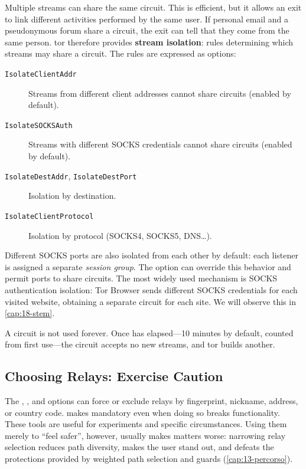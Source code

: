 Multiple streams can share the same circuit. This is efficient, but it allows an exit to link different activities performed by the same user. If personal email and a pseudonymous forum share a circuit, the exit can tell that they come from the same person. tor therefore provides \textbf{stream isolation}: rules determining which streams may share a circuit. The rules are expressed as  options:
\begin{description}
  \item[\texttt{IsolateClientAddr}] Streams from different client addresses cannot share circuits (enabled by default).
  \item[\texttt{IsolateSOCKSAuth}] Streams with different SOCKS credentials cannot share circuits (enabled by default).
  \item[\texttt{IsolateDestAddr}, \texttt{IsolateDestPort}] Isolation by destination.
  \item[\texttt{IsolateClientProtocol}] Isolation by protocol (SOCKS4, SOCKS5, DNS\ldots).
\end{description}
Different SOCKS ports are also isolated from each other by default: each listener is assigned a separate \emph{session group}. The  option can override this behavior and permit ports to share circuits. The most widely used mechanism is SOCKS authentication isolation: Tor Browser sends different SOCKS credentials for each visited website, obtaining a separate circuit for each site. We will observe this in \cref{cap:18-stem}.

A circuit is not used forever. Once  has elapsed---10 minutes by default, counted from first use---the circuit accepts no new streams, and tor builds another.

\subsection{Choosing Relays: Exercise Caution}

The , , and  options can force or exclude relays by fingerprint, nickname, address, or country code.  makes  mandatory even when doing so breaks functionality. These tools are useful for experiments and specific circumstances. Using them merely to \enquote{feel safer}, however, usually makes matters worse: narrowing relay selection reduces path diversity, makes the user stand out, and defeats the protections provided by weighted path selection and guards (\cref{cap:13-percorso}).

